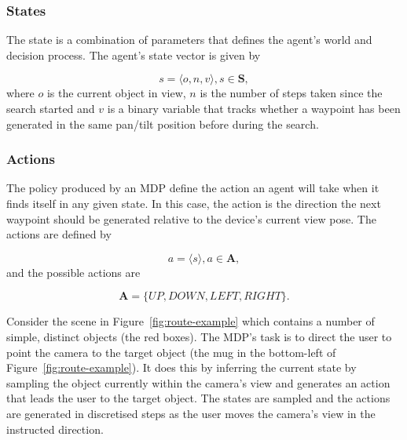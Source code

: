 \documentclass[a4paper, twoside]{article}
\begin{document}
\subsubsection{States}\label{sec:states}

\noindent The state is a combination of parameters that defines the agent's world and decision process. The agent's state vector is given by 

\begin{equation}
  s = \langle{}o, n, v\rangle, s\in{}\mathbf{S}, 
\end{equation}
where $o$ is the current object in view, $n$ is the number of steps taken since the search started and $v$ is a binary variable that tracks whether a waypoint has been generated in the same pan/tilt position before during the search. 

\subsubsection{Actions}

The policy produced by an MDP define the action an agent will take when it finds itself in any given state. In this case, the action is the direction the next waypoint should be generated relative to the device's current view pose. The actions are defined by

\begin{equation}
  a = \langle{}s\rangle, a\in{}\mathbf{A},
\end{equation}
and the possible actions are

\begin{equation}
  \mathbf{A} = \{UP, DOWN, LEFT, RIGHT\}.
\end{equation}

Consider the scene in Figure~\ref{fig:route-example} which contains a number of simple, distinct objects (the red boxes). The MDP's task is to direct the user to point the camera to the target object (the mug in the bottom-left of Figure~\ref{fig:route-example}). It does this by inferring the current state by sampling the object currently within the camera's view and generates an action that leads the user to the target object. The states are sampled and the actions are generated in discretised steps as the user moves the camera's view in the instructed direction. %
\end{document}
